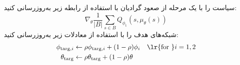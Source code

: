 \begin{algorithm}[H]
\begin{algorithmic}[1]
  		\State سیاست را با یک مرحله از صعود گرادیان با استفاده از رابطه زیر به‌روزرسانی کنید:
  		 \begin{equation*}
  		 	 \nabla_{\theta} \frac{1}{|B|}\sum_{s \in B}Q_{\phi_1}(s, \mu_{\theta}(s))
  		 	  \end{equation*}
  		\State شبکه‌های هدف را با استفاده از معادلات زیر به‌روزرسانی کنید:
  		\begin{align*}
  			\phi_{\text{targ},i} &\leftarrow \rho \phi_{\text{targ}, i} + (1-\rho) \phi_i \quad \text{\lr{for }}i=1,2  \\
  			\theta_{\text{targ}} &\leftarrow \rho \theta_{\text{targ}} + (1-\rho) \theta
  		\end{align*}
  		\EndIf
  		\EndFor
  		\EndIf
  		\EndWhile
  	\end{algorithmic}
  \end{algorithm}
  
  
  
  
  
  
  
  
  
  
  